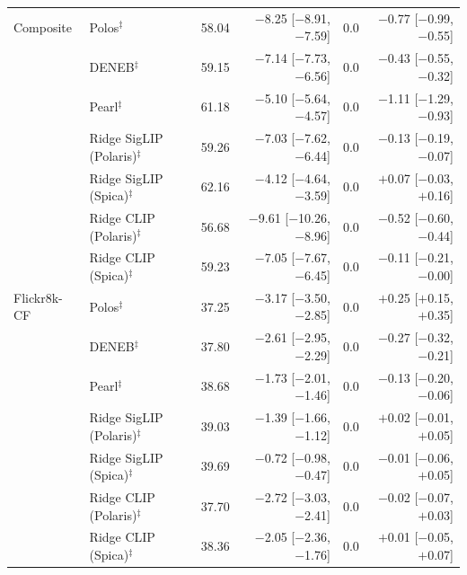 \begin{tabular}{llrrrr}
Composite & Polos$^{\ddagger}$ & 58.04 & $-$8.25 [$-$8.91, $-$7.59] & 0.0 & $-$0.77 [$-$0.99, $-$0.55] \\
 & DENEB$^{\ddagger}$ & 59.15 & $-$7.14 [$-$7.73, $-$6.56] & 0.0 & $-$0.43 [$-$0.55, $-$0.32] \\
 & Pearl$^{\ddagger}$ & 61.18 & $-$5.10 [$-$5.64, $-$4.57] & 0.0 & $-$1.11 [$-$1.29, $-$0.93] \\
 & Ridge SigLIP (Polaris)$^{\ddagger}$ & 59.26 & $-$7.03 [$-$7.62, $-$6.44] & 0.0 & $-$0.13 [$-$0.19, $-$0.07] \\
 & Ridge SigLIP (Spica)$^{\ddagger}$ & 62.16 & $-$4.12 [$-$4.64, $-$3.59] & 0.0 & $+$0.07 [$-$0.03, $+$0.16] \\
 & Ridge CLIP (Polaris)$^{\ddagger}$ & 56.68 & $-$9.61 [$-$10.26, $-$8.96] & 0.0 & $-$0.52 [$-$0.60, $-$0.44] \\
 & Ridge CLIP (Spica)$^{\ddagger}$ & 59.23 & $-$7.05 [$-$7.67, $-$6.45] & 0.0 & $-$0.11 [$-$0.21, $-$0.00] \\
\addlinespace
Flickr8k-CF & Polos$^{\ddagger}$ & 37.25 & $-$3.17 [$-$3.50, $-$2.85] & 0.0 & $+$0.25 [$+$0.15, $+$0.35] \\
 & DENEB$^{\ddagger}$ & 37.80 & $-$2.61 [$-$2.95, $-$2.29] & 0.0 & $-$0.27 [$-$0.32, $-$0.21] \\
 & Pearl$^{\ddagger}$ & 38.68 & $-$1.73 [$-$2.01, $-$1.46] & 0.0 & $-$0.13 [$-$0.20, $-$0.06] \\
 & Ridge SigLIP (Polaris)$^{\ddagger}$ & 39.03 & $-$1.39 [$-$1.66, $-$1.12] & 0.0 & $+$0.02 [$-$0.01, $+$0.05] \\
 & Ridge SigLIP (Spica)$^{\ddagger}$ & 39.69 & $-$0.72 [$-$0.98, $-$0.47] & 0.0 & $-$0.01 [$-$0.06, $+$0.05] \\
 & Ridge CLIP (Polaris)$^{\ddagger}$ & 37.70 & $-$2.72 [$-$3.03, $-$2.41] & 0.0 & $-$0.02 [$-$0.07, $+$0.03] \\
 & Ridge CLIP (Spica)$^{\ddagger}$ & 38.36 & $-$2.05 [$-$2.36, $-$1.76] & 0.0 & $+$0.01 [$-$0.05, $+$0.07] \\
\bottomrule
\end{tabular}
